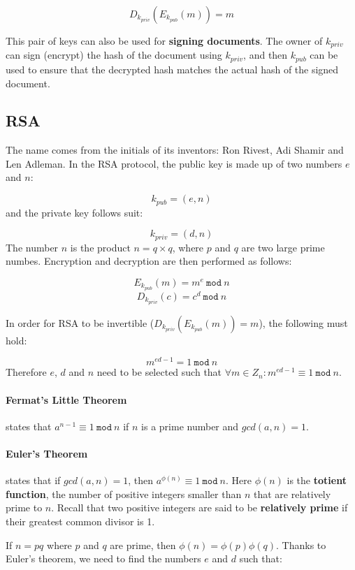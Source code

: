 \documentclass[12pt, letterpaper]{article}
\begin{document}
\[
  D_{k_{priv}} (E_{k_{pub}} (m)) = m
\]

This pair of keys can also be used for \textbf{signing documents}.
The owner of $k_{priv}$ can sign (encrypt) the hash of the document using $k_{priv}$, and then $k_{pub}$ can be used to ensure that the decrypted hash matches the actual hash of the signed document.

\subsection{RSA}

The name comes from the initials of its inventors: Ron Rivest, Adi Shamir and Len Adleman.
In the RSA protocol, the public key is made up of two numbers $e$ and $n$:

\[
  k_{pub} = (e, n)
\]
and the private key follows suit:

\[
  k_{priv} = (d, n)
\]
The number $n$ is the product $n = q \times q$, where $p$ and $q$ are two large prime numbes.
Encryption and decryption are then performed as follows:

\[
  E_{k_{pub}} (m) = m^e \: \mathtt{mod} \: n
\]
\[
  D_{k_{priv}} (c) = c^d \: \mathtt{mod} \: n
\]

In order for RSA to be invertible ($D_{k_{priv}} (E_{k_{pub}} (m)) = m$), the following must hold:

\[
  m^{ed - 1} = 1 \: \mathtt{mod} \: n
\]
Therefore $e$, $d$ and $n$ need to be selected such that $\forall m \in Z_n: m^{ed-1} \equiv 1 \: \mathtt{mod} \: n$.

\paragraph{Fermat's Little Theorem} states that $a^{n-1} \equiv 1 \: \mathtt{mod} \: n$ if $n$ is a prime number and $gcd(a, n) = 1$.

\paragraph{Euler's Theorem} states that if $gcd(a, n) = 1$, then $a^{\phi(n)} \equiv 1 \: \mathtt{mod} \: n$.
Here $\phi(n)$ is the \textbf{totient function}, the number of positive integers smaller than $n$ that are relatively prime to $n$.
Recall that two positive integers are said to be \textbf{relatively prime} if their greatest common divisor is 1.

If $n = pq$ where $p$ and $q$ are prime, then $\phi(n) = \phi(p) \phi(q)$.
Thanks to Euler's theorem, we need to find the numbers $e$ and $d$ such that:
\end{document}
